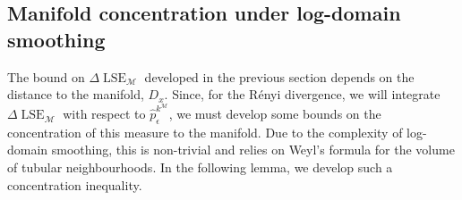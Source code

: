 \documentclass[10pt]{article}
\theoremstyle{plain}
\theoremstyle{definition}
\theoremstyle{remark}
\newcommand{\M}{{\mathcal{M}}}
\newcommand{\lse}{\operatorname{LSE}}
\begin{document}
    





\subsection{Manifold concentration under log-domain smoothing}
The bound on \(\Delta \lse_\M\) developed in the previous section depends on the distance to the manifold, \(D_x\). Since, for the R\'enyi divergence, we will integrate \(\Delta \lse_\M\) with respect to \(\hat{p}^{k^\M}_\epsilon\), we must develop some bounds on the concentration of this measure to the manifold. Due to the complexity of log-domain smoothing, this is non-trivial and relies on Weyl's formula for the volume of tubular neighbourhoods. In the following lemma, we develop such a concentration inequality.
\end{document}
